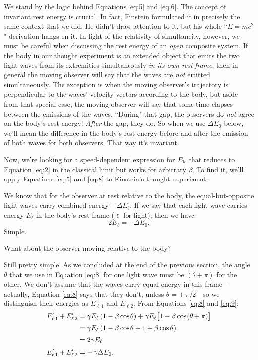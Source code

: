 \documentclass[12pt]{article}
\begin{document}
We stand by the logic behind Equations \ref{eq:5} and \ref{eq:6}. The concept of invariant rest energy is crucial. In fact, Einstein formulated it in precisely the same context that we did. He didn't draw attention to it, but his whole ``$E=mc^2$" derivation hangs on it. In light of the relativity of simultaneity, however, we must be careful when discussing the rest energy of an \emph{open} composite system. If the body in our thought experiment is an extended object that emits the two light waves from its extremities simultaneously \emph{in its own rest frame}, then in general the moving observer will say that the waves are \emph{not} emitted simultaneously. The exception is when the moving observer's trajectory is perpendicular to the waves' velocity vectors according to the body, but aside from that special case, the moving observer will say that some time elapses between the emissions of the waves. ``During" that gap, the observers do \emph{not} agree on the body's rest energy! \emph{After} the gap, they do. So when we use $\Delta E_0$ below, we'll mean the difference in the body's rest energy before and after the emission of both waves for both observers. That way it's invariant.

Now, we're looking for a speed-dependent expression for $E_{\mkern.5mu \textrm{k}}$ that reduces to Equation \ref{eq:2} in the classical limit but works for arbitrary $\beta$. To find it, we'll apply Equations \ref{eq:5} and \ref{eq:8} to Einstein's thought experiment.

We know that for the observer at rest relative to the body, the equal-but-opposite light waves carry combined energy $-\Delta E_0$. If we say that each light wave carries energy $E_{\ell}$ in the body's rest frame ($\ell$ for light), then we have:
\begin{equation}\label{eq:9}
2E_{\ell}=-\Delta E_0.
\end{equation}
Simple.

What about the observer moving relative to the body?

Still pretty simple. As we concluded at the end of the previous section, the angle $\theta$ that we use in Equation \ref{eq:8} for one light wave must be $(\theta + \pi)$ for the other. We don't assume that the waves carry equal energy in this frame---actually, Equation \ref{eq:8} says that they don't, unless $\theta = \pm \, \pi / 2$---so we distinguish their energies as $E_{\ell \, 1}^{\prime}$ and $E_{\ell \, 2}^{\prime}$. From Equations \ref{eq:8} and \ref{eq:9}:
\begin{equation}\label{eq:10}
\begin{split}
E_{\ell \, 1}^{\prime} + E_{\ell \, 2}^{\prime} &= \gamma E_{\ell} \left(1-\beta\cos\theta \right) + \gamma E_{\ell} \big[ 1 - \beta \cos \mkern1.5mu ( \theta + \pi ) \big] \\[2pt]
&= \gamma E_{\ell} \left(1 - \beta\cos\theta + 1 + \beta\cos\theta \right) \\[2pt]
&= 2 \gamma E_{\ell} \\[3pt]
E_{\ell \, 1}^{\prime} + E_{\ell \, 2}^{\prime} &= - \, \gamma \Delta E_0.
\end{split}
\end{equation}
\end{document}
